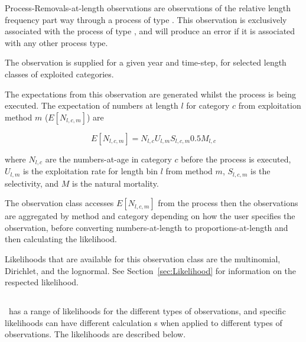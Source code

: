 Process-Removals-at-length observations are observations of the relative length frequency part way through a process of type . This observation is exclusively associated with the process of type , and will produce an error if it is associated with any other process type.

The observation is supplied for a given year and time-step, for selected length classes of exploited categories.

The expectations from this observation are generated whilst the process is being executed. The expectation of numbers at length $l$ for category $c$ from exploitation method $m$ ($E[N_{l,c,m}]$) are

\begin{equation}
	E[N_{l,c,m}] = N_{l,c} U_{l,m} S_{l,c,m} 0.5 M_{l,c}
\end{equation}

where $N_{l,c}$ are the numbers-at-age in category $c$ before the process is executed, $U_{l,m}$ is the exploitation rate for length bin $l$ from method $m$, $S_{l,c,m}$ is the selectivity, and $M$ is the natural mortality.

The observation class accesses $E[N_{l,c,m}]$ from the process then the observations are aggregated by method and category depending on how the user specifies the observation, before converting numbers-at-length to proportions-at-length and then calculating the likelihood.

Likelihoods that are available for this observation class are the multinomial, Dirichlet, and the lognormal. See Section~\ref{sec:Likelihood} for information on the respected likelihood.

\fi %

\subsection{ \label{sec:Likelihood}}

\CNAME\ has a range of likelihoods for the different types of observations, and specific likelihoods can have different calculation s when applied to different types of observations. The likelihoods are described below. 

\subsection{}

